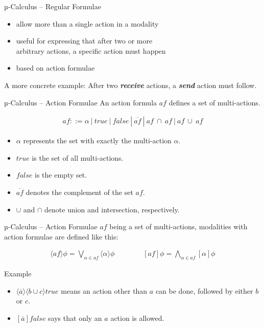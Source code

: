 \documentclass[aspectratio=1610]{beamer}
\begin{document}
  \begin{frame}{µ-Calculus – Regular Formulae}
    \begin{itemize}
      \item allow more than a single action in a modality
      \item useful for expressing that after two or more \\
            arbitrary actions, a specific action must happen
      \item based on action formulae
    \end{itemize}

    \begin{exampleblock}{A more concrete example:}
      After two \textit{\textbf{receive}} actions, a \textit{\textbf{send}} action must follow.
    \end{exampleblock}
  \end{frame}

  \begin{frame}{µ-Calculus – Action Formulae}
    An action formula $af$ defines a set of multi-actions.

    \begin{align*}
      af ::= \alpha\ |\ true\ |\ false\ |\ \overline{af}\ |\ af\ \cap\ af\ |\ af\ \cup\ af
    \end{align*}

    \begin{itemize}
      \item $\alpha$ represents the set with exactly the multi-action $\alpha$.
      \item $true$ is the set of all multi-actions.
      \item $false$ is the empty set.
      \item $\overline{af}$ denotes the complement of the set $af$.
      \item $\cup$ and $\cap$ denote union and intersection, respectively.
    \end{itemize}
  \end{frame}

  \begin{frame}{µ-Calculus – Action Formulae}
    $af$ being a set of multi-actions, modalities with action formulae are defined like this:

    \begin{align*}
      \langle{af}\rangle\phi = \bigvee_{\alpha \in af} \langle\alpha\rangle\phi
      \qquad\qquad
      [af]\phi = \bigwedge_{\alpha \in af} [\alpha]\phi
    \end{align*}

    \begin{exampleblock}{Example}
      \begin{itemize}
        \item $\langle\overline{a}\rangle\langle{b \cup c}\rangle{true}$ means an action other than $a$ can be done, followed by either $b$ or $c$.
        \item $[\overline{a}]false$ says that only an $a$ action is allowed.
      \end{itemize}
    \end{exampleblock}
  \end{frame}
\end{document}
